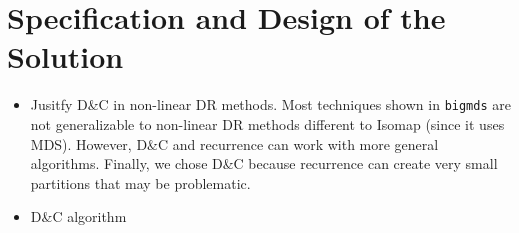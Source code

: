 \section{Specification and Design of the Solution}

\begin{itemize}
    \item Jusitfy D\&C in non-linear DR methods. Most techniques shown in \verb|bigmds| are not generalizable to non-linear DR methods different to Isomap (since it uses MDS). However, D\&C and recurrence can work with more general algorithms. Finally, we chose D\&C because recurrence can create very small partitions that may be problematic.
    \item D\&C algorithm
\end{itemize}